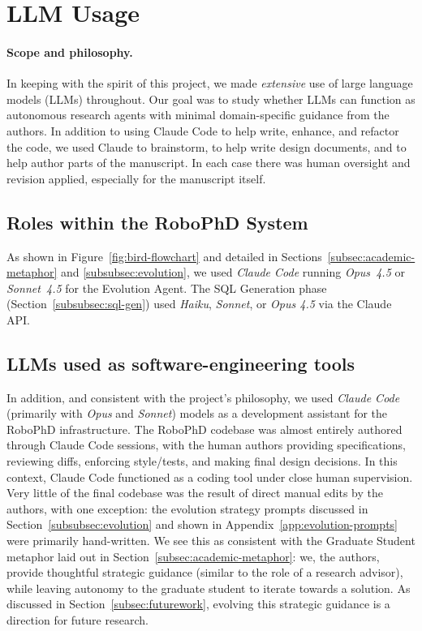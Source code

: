 \documentclass{article}
\begin{document}
\appendix

\section{LLM Usage}
\label{app:llm-usage}

\paragraph{Scope and philosophy.}
In keeping with the spirit of this project, we made \emph{extensive} use of large language models (LLMs) throughout. Our goal was to study whether LLMs can function as autonomous research agents with minimal domain-specific guidance from the authors. In addition to using Claude Code to help write, enhance, and refactor the code, we used Claude to brainstorm, to help write design documents, and to help author parts of the manuscript. In each case there was human oversight and revision applied, especially for the manuscript itself. 

\subsection{Roles within the RoboPhD System}
\label{app:llm-usage:system}

As shown in Figure~\ref{fig:bird-flowchart} and detailed in Sections~\ref{subsec:academic-metaphor} and \ref{subsubsec:evolution}, we used \emph{Claude Code} running \emph{Opus~4.5} or \emph{Sonnet~4.5} for the Evolution Agent. The SQL Generation phase (Section~\ref{subsubsec:sql-gen}) used \emph{Haiku}, \emph{Sonnet}, or \emph{Opus 4.5} via the Claude API.

\subsection{LLMs used as software-engineering tools}
\label{app:llm-usage:infra}

In addition, and consistent with the project's philosophy, we used \emph{Claude Code} (primarily with \emph{Opus} and \emph{Sonnet}) models as a development assistant for the RoboPhD infrastructure. The RoboPhD codebase was almost entirely authored through Claude Code sessions, with the human authors providing specifications, reviewing diffs, enforcing style/tests, and making final design decisions. In this context, Claude Code functioned as a coding tool under close human supervision. Very little of the final codebase was the result of direct manual edits by the authors, with one exception: the evolution strategy prompts discussed in Section~\ref{subsubsec:evolution} and shown in Appendix~\ref{app:evolution-prompts} were primarily hand-written. We see this as consistent with the Graduate Student metaphor laid out in Section~\ref{subsec:academic-metaphor}: we, the authors, provide thoughtful strategic guidance (similar to the role of a research advisor), while leaving autonomy to the graduate student to iterate towards a solution.  As discussed in Section~\ref{subsec:futurework}, evolving this strategic guidance is a direction for future research.
\end{document}
